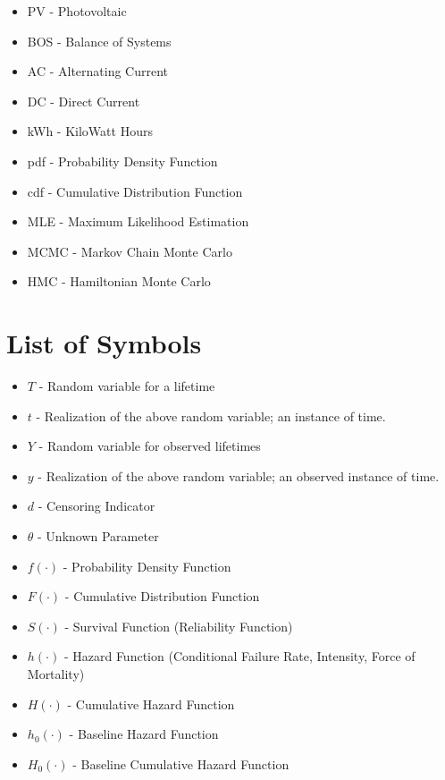 \begin{itemize}

\item PV -  Photovoltaic
\item BOS - Balance of Systems
\item AC - Alternating Current
\item DC - Direct Current
\item kWh - KiloWatt Hours

\item pdf - Probability Density Function
\item cdf - Cumulative Distribution Function
\item MLE - Maximum Likelihood Estimation
\item MCMC - Markov Chain Monte Carlo
\item HMC - Hamiltonian Monte Carlo


\end{itemize}

\section*{List of Symbols}

\begin{itemize}

\item $T$ - Random variable for a lifetime
\item $t$ - Realization of the above random variable; an instance of time.
\item $Y$ - Random variable for observed lifetimes
\item $y$ - Realization of the above random variable; an observed instance of time.
\item $d$ - Censoring Indicator
\item $\theta$ - Unknown Parameter

\item $f(\cdot)$ - Probability Density Function
\item $F(\cdot)$ - Cumulative Distribution Function
\item $S(\cdot)$ - Survival Function (Reliability Function)
\item $h(\cdot)$ - Hazard Function (Conditional Failure Rate, Intensity, Force of Mortality)
\item $H(\cdot)$ - Cumulative Hazard Function
\item $h_0(\cdot)$ - Baseline Hazard Function
\item $H_0(\cdot)$ - Baseline Cumulative Hazard Function

\end{itemize}

